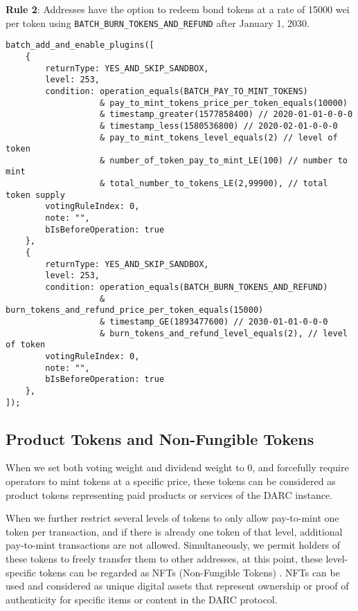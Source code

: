 \documentclass[main.tex]{subfiles}
\begin{document}
\textbf{Rule 2}: Addresses have the option to redeem bond tokens at a rate of 15000 wei per token using \texttt{BATCH\_BURN\_TOKENS\_AND\_REFUND} after January 1, 2030.

\begin{verbatim}
batch_add_and_enable_plugins([
    {
        returnType: YES_AND_SKIP_SANDBOX,
        level: 253, 
        condition: operation_equals(BATCH_PAY_TO_MINT_TOKENS)
                   & pay_to_mint_tokens_price_per_token_equals(10000)
                   & timestamp_greater(1577858400) // 2020-01-01-0-0-0
                   & timestamp_less(1580536800) // 2020-02-01-0-0-0
                   & pay_to_mint_tokens_level_equals(2) // level of token
                   & number_of_token_pay_to_mint_LE(100) // number to mint
                   & total_number_to_tokens_LE(2,99900), // total token supply
        votingRuleIndex: 0, 
        note: "",
        bIsBeforeOperation: true  
    },
    {
        returnType: YES_AND_SKIP_SANDBOX,
        level: 253, 
        condition: operation_equals(BATCH_BURN_TOKENS_AND_REFUND)
                   & burn_tokens_and_refund_price_per_token_equals(15000)
                   & timestamp_GE(1893477600) // 2030-01-01-0-0-0
                   & burn_tokens_and_refund_level_equals(2), // level of token
        votingRuleIndex: 0, 
        note: "",
        bIsBeforeOperation: true  
    },
]);
\end{verbatim}

\subsection{Product Tokens and Non-Fungible Tokens}

When we set both voting weight and dividend weight to 0, and forcefully require operators to mint tokens at a specific price, these tokens can be considered as product tokens representing paid products or services of the DARC instance.

When we further restrict several levels of tokens to only allow pay-to-mint one token per transaction, and if there is already one token of that level, additional pay-to-mint transactions are not allowed. Simultaneously, we permit holders of these tokens to freely transfer them to other addresses, at this point, these level-specific tokens can be regarded as NFTs (Non-Fungible Tokens) \cite{ethereumERC721NonFungible}. NFTs can be used and considered as unique digital assets that represent ownership or proof of authenticity for specific items or content in the DARC protocol.
\end{document}

